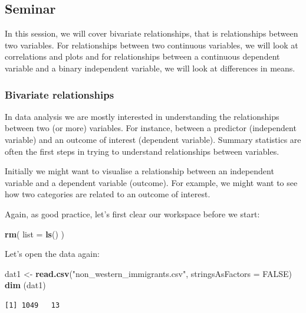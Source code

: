 \documentclass[]{article}
\newenvironment{Shaded}{\begin{snugshade}}{\end{snugshade}}
\newcommand{\DataTypeTok}[1]{\textcolor[rgb]{0.13,0.29,0.53}{#1}}
\newcommand{\KeywordTok}[1]{\textcolor[rgb]{0.13,0.29,0.53}{\textbf{#1}}}
\newcommand{\NormalTok}[1]{#1}
\newcommand{\OtherTok}[1]{\textcolor[rgb]{0.56,0.35,0.01}{#1}}
\newcommand{\StringTok}[1]{\textcolor[rgb]{0.31,0.60,0.02}{#1}}
\begin{document}
\hypertarget{seminar-4}{%
\subsection{Seminar}\label{seminar-4}}

In this session, we will cover bivariate relationships, that is relationships between two variables. For relationships between two continuous variables, we will look at correlations and plots and for relationships between a continuous dependent variable and a binary independent variable, we will look at differences in means.

\hypertarget{bivariate-relationships}{%
\subsubsection{Bivariate relationships}\label{bivariate-relationships}}

In data analysis we are mostly interested in understanding the relationships between two (or more) variables. For instance, between a predictor (independent variable) and an outcome of interest (dependent variable). Summary statistics are often the first steps in trying to understand relationships between variables.

Initially we might want to visualise a relationship between an independent variable and a dependent variable (outcome). For example, we might want to see how two categories are related to an outcome of interest.

Again, as good practice, let's first clear our workspace before we start:

\begin{Shaded}
\begin{Highlighting}[]
\KeywordTok{rm}\NormalTok{( }\DataTypeTok{list =} \KeywordTok{ls}\NormalTok{() )}
\end{Highlighting}
\end{Shaded}

Let's open the data again:

\begin{Shaded}
\begin{Highlighting}[]
\NormalTok{dat1 <-}\StringTok{ }\KeywordTok{read.csv}\NormalTok{(}\StringTok{"non_western_immigrants.csv"}\NormalTok{, }\DataTypeTok{stringsAsFactors =} \OtherTok{FALSE}\NormalTok{)}
\KeywordTok{dim}\NormalTok{ (dat1)}
\end{Highlighting}
\end{Shaded}

\begin{verbatim}
[1] 1049   13
\end{verbatim}
\end{document}
